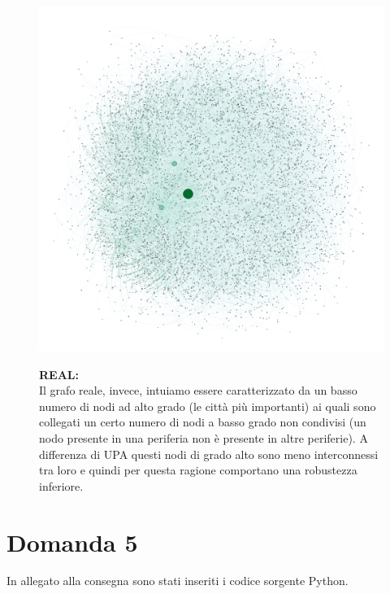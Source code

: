 \documentclass{article}
\begin{document}
\begin{figure}[H]
	\begin{minipage}{0.4\linewidth}
		\centering
		\includegraphics[width=0.9\linewidth, valign=t]{figures/real}
	\end{minipage}
	\begin{minipage}{0.55\linewidth}
		\textbf{REAL:}\\
		Il grafo reale, invece, intuiamo essere caratterizzato da un basso numero di nodi ad alto grado (le città più importanti) ai quali sono collegati un certo numero di nodi a basso grado non condivisi (un nodo presente in una periferia non è presente in altre periferie). A differenza di UPA questi nodi di grado alto sono meno interconnessi tra loro e quindi per questa ragione comportano una robustezza inferiore.\\
	\end{minipage}
\end{figure}

\section*{Domanda 5}
In allegato alla consegna sono stati inseriti i codice sorgente Python.
\end{document}
